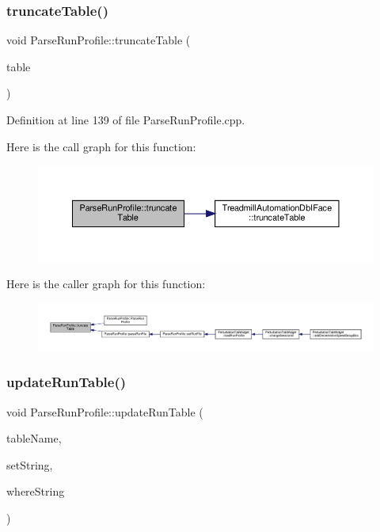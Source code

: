 \subsubsection{\texorpdfstring{truncate\+Table()}{truncateTable()}}
{\footnotesize\ttfamily void Parse\+Run\+Profile\+::truncate\+Table (\begin{DoxyParamCaption}\item[{Q\+String}]{table }\end{DoxyParamCaption})}



Definition at line 139 of file Parse\+Run\+Profile.\+cpp.

Here is the call graph for this function\+:
\nopagebreak
\begin{figure}[H]
\begin{center}
\leavevmode
\includegraphics[width=350pt]{class_parse_run_profile_a4001ee3344847bda70e39cba1c14cd61_cgraph}
\end{center}
\end{figure}
Here is the caller graph for this function\+:
\nopagebreak
\begin{figure}[H]
\begin{center}
\leavevmode
\includegraphics[width=350pt]{class_parse_run_profile_a4001ee3344847bda70e39cba1c14cd61_icgraph}
\end{center}
\end{figure}
\mbox{\label{class_parse_run_profile_a01b21a62fe9b4e334fe0718416510340}} 
\subsubsection{\texorpdfstring{update\+Run\+Table()}{updateRunTable()}}
{\footnotesize\ttfamily void Parse\+Run\+Profile\+::update\+Run\+Table (\begin{DoxyParamCaption}\item[{Q\+String}]{table\+Name,  }\item[{Q\+String}]{set\+String,  }\item[{Q\+String}]{where\+String }\end{DoxyParamCaption})}



